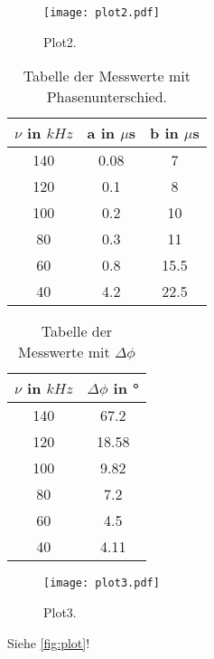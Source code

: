\begin{figure}
  \centering
  \texttt{[image: plot2.pdf]}
  \caption{Plot2.}
  \label{fig:plot2}
\end{figure}

\begin{table}
  \centering
  \caption{Tabelle der Messwerte mit Phasenunterschied.}
  \label{tab:tab3}
  \begin{tabular}{c c c}
    \toprule
    $\nu$ in $kHz$ & a in $\mu$s & b in $\mu$s\\
    \midrule
    140 & 0.08 & 7\\
    120 & 0.1 & 8\\
    100 & 0.2 & 10\\
    80 & 0.3 & 11\\
    60 & 0.8 & 15.5\\
    40 & 4.2 & 22.5\\
    \bottomrule
  \end{tabular}
\end{table}

\begin{table}
  \centering
  \caption{Tabelle der Messwerte mit \(\Delta\phi\)}
  \label{tab:tab4}
  \begin{tabular}{c c}
    \toprule
    $\nu$ in $kHz$ & $\Delta\phi$ in °\\
    \midrule
    140 & 67.2\\
    120 & 18.58\\
    100 & 9.82\\
    80 & 7.2\\
    60 & 4.5\\
    40 & 4.11\\
    \bottomrule
  \end{tabular}
\end{table}

\begin{figure}
  \centering
  \texttt{[image: plot3.pdf]}
  \caption{Plot3.}
  \label{fig:plot3}
\end{figure}

Siehe \autoref{fig:plot}!

